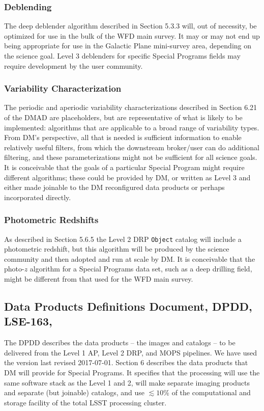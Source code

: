 \documentclass[DM,lsstdraft,toc]{lsstdoc}
\begin{document}
\subsubsection{Deblending} The deep deblender algorithm described in Section 5.3.3 will, out of necessity, be optimized for use in the bulk of the WFD main survey. It may or may not end up being appropriate for use in the Galactic Plane mini-survey area, depending on the science goal. Level 3 deblenders for specific Special Programs fields may require development by the user community.

\subsubsection{Variability Characterization} The periodic and aperiodic variability characterizations described in Section 6.21 of the DMAD are placeholders, but are representative of what is likely to be implemented: algorithms that are applicable to a broad range of variability types. From DM's perspective, all that is needed is sufficient information to enable relatively useful filters, from which the downstream broker/user can do additional filtering, and these parameterizations might not be sufficient for all science goals. It is conceivable that the goals of a particular Special Program might require different algorithms; these could be provided by DM, or written as Level 3 and either made joinable to the DM reconfigured data products or perhaps incorporated directly.

\subsubsection{Photometric Redshifts} As described in Section 5.6.5 the Level 2 DRP {\tt Object} catalog will include a photometric redshift, but this algorithm will be produced by the science community and then adopted and run at scale by DM. It is conceivable that the photo-$z$ algorithm for a Special Programs data set, such as a deep drilling field, might be different from that used for the WFD main survey. 

\subsection{Data Products Definitions Document, DPDD, LSE-163, \cite{LSE-163}}\label{ssec:docrev_dpdd}

The DPDD describes the data products -- the images and catalogs -- to be delivered from the Level 1 AP, Level 2 DRP, and MOPS pipelines. We have used the version last revised 2017-07-01. Section 6 describes the data products that DM will provide for Special Programs. It specifies that the processing will use the same software stack as the Level 1 and 2, will make separate imaging products and separate (but joinable) catalogs, and use $\lesssim10\%$ of the computational and storage facility of the total LSST processing cluster. 
\end{document}

